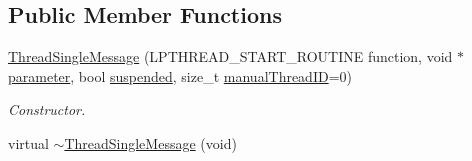 \subsection*{Public Member Functions}
\begin{DoxyCompactItemize}
\item 
\hyperlink{class_thread_single_message_a3dc51455525b6c764817e9ee7d598010}{ThreadSingleMessage} (LPTHREAD\_\-START\_\-ROUTINE function, void $\ast$\hyperlink{class_thread_single_ad0aa14d604bca6bb1ba5ec5721cd859c}{parameter}, bool \hyperlink{class_thread_single_a710b7388ce616e858f776efab32fbe61}{suspended}, size\_\-t \hyperlink{class_thread_single_a43cc2e11c57294cfcf6f61ef9754f70b}{manualThreadID}=0)
\begin{DoxyCompactList}\small\item\em Constructor. \item\end{DoxyCompactList}\item 
\hypertarget{class_thread_single_message_ab350d533f27480153bda0d817a55cd23}{
virtual \hyperlink{class_thread_single_message_ab350d533f27480153bda0d817a55cd23}{$\sim$ThreadSingleMessage} (void)}
\label{class_thread_single_message_ab350d533f27480153bda0d817a55cd23}


\end{DoxyCompactItemize}
